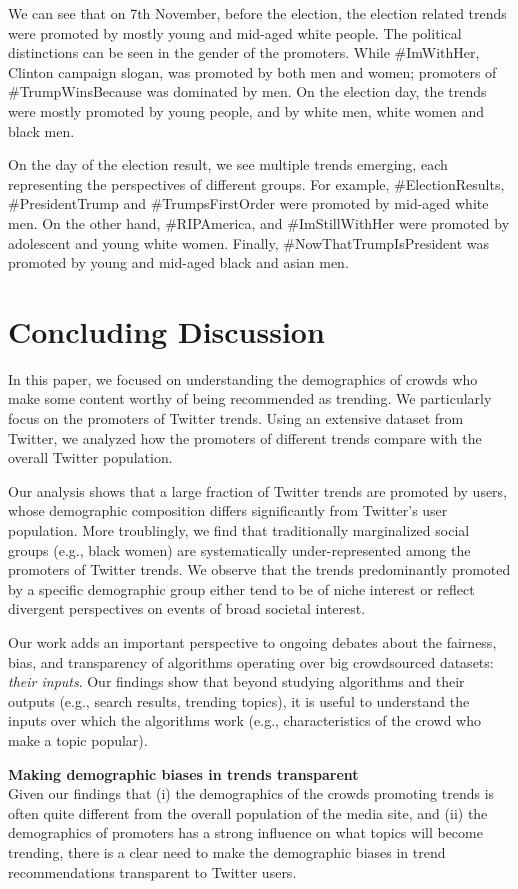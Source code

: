 \documentclass[letterpaper]{article}
\begin{document}
We can see that on 7th November, before the election, the election related trends were promoted by mostly young and mid-aged white people. The political distinctions can be seen in the gender of the promoters. While \#ImWithHer, Clinton campaign slogan, was promoted by both men and women; promoters of \#TrumpWinsBecause was dominated by men. On the election day, the trends were mostly promoted by young people, and by white men, white women and black men.

On the day of the election result, we see multiple trends emerging, each representing the perspectives of different groups. For example, \#ElectionResults, \#PresidentTrump and \#TrumpsFirstOrder were promoted by mid-aged white men. On the other hand, \#RIPAmerica, and \#ImStillWithHer were promoted by adolescent and young white women.
Finally, \#NowThatTrumpIsPresident was promoted by young and mid-aged black and asian men.

\section{Concluding Discussion}
\noindent In this paper, we focused on understanding the demographics
of crowds who make some content worthy of being recommended as
trending.  We particularly focus on the promoters of Twitter
trends. Using an extensive dataset from Twitter, we analyzed how the
promoters of different trends compare with the overall Twitter
population. 

Our analysis shows that a large fraction of Twitter trends are promoted
by users, whose demographic composition differs significantly from
Twitter's user population. More troublingly, we find that
traditionally marginalized social groups (e.g., black women) are
systematically under-represented among the promoters of Twitter
trends. We observe that the trends predominantly promoted by a specific
demographic group either tend to be of niche interest or reflect
divergent perspectives on events of broad societal interest.

Our work adds an important perspective to ongoing debates about the
fairness, bias, and transparency of algorithms operating over big
crowdsourced datasets: {\it their inputs}. Our findings show that
beyond studying algorithms and their outputs (e.g., search results,
trending topics), it is useful to understand the inputs over which the
algorithms work (e.g., characteristics of the crowd who make
a topic popular).

\vspace{2mm}
\noindent \textbf{Making demographic biases in trends transparent} \\   
Given our findings that (i) the demographics of the crowds promoting
trends is often quite different from the overall population of the
media site, and (ii) the demographics of promoters has a strong influence
on what topics will become trending, there is a clear need to make the
demographic biases in trend recommendations transparent to Twitter
users.
\end{document}
